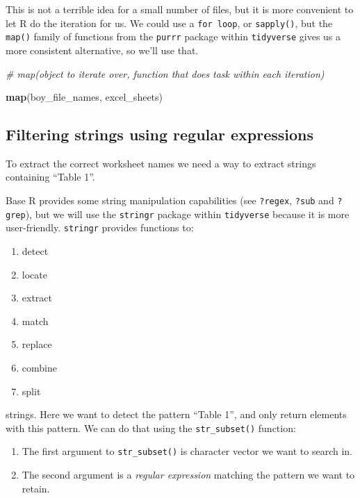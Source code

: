 \documentclass[]{book}
\newenvironment{Shaded}{\begin{snugshade}}{\end{snugshade}}
\newcommand{\CommentTok}[1]{\textcolor[rgb]{0.56,0.35,0.01}{\textit{#1}}}
\newcommand{\KeywordTok}[1]{\textcolor[rgb]{0.13,0.29,0.53}{\textbf{#1}}}
\newcommand{\NormalTok}[1]{#1}
\providecommand{\tightlist}{%
  \setlength{\itemsep}{0pt}\setlength{\parskip}{0pt}}
\begin{document}
This is not a terrible idea for a small number of files, but it is
more convenient to let R do the iteration for us. We could use a \texttt{for\ loop},
or \texttt{sapply()}, but the \texttt{map()} family of functions from the \texttt{purrr}
package within \texttt{tidyverse} gives us a more consistent alternative,
so we'll use that.

\begin{Shaded}
\begin{Highlighting}[]
\CommentTok{# map(object to iterate over, function that does task within each iteration)}

\KeywordTok{map}\NormalTok{(boy_file_names, excel_sheets)}
\end{Highlighting}
\end{Shaded}

\hypertarget{filtering-strings-using-regular-expressions}{%
\subsection{Filtering strings using regular expressions}\label{filtering-strings-using-regular-expressions}}

To extract the correct worksheet names we need a way to extract
strings containing ``Table 1''.

Base R provides some string manipulation capabilities
(see \texttt{?regex}, \texttt{?sub} and \texttt{?grep}), but we will use the
\texttt{stringr} package within \texttt{tidyverse} because it is more
user-friendly. \texttt{stringr} provides functions to:

\begin{enumerate}
\def\labelenumi{\arabic{enumi}.}
\tightlist
\item
  detect
\item
  locate
\item
  extract
\item
  match
\item
  replace
\item
  combine
\item
  split
\end{enumerate}

strings. Here we want to detect the pattern ``Table 1'', and only
return elements with this pattern. We can do that using the
\texttt{str\_subset()} function:

\begin{enumerate}
\def\labelenumi{\arabic{enumi}.}
\tightlist
\item
  The first argument to \texttt{str\_subset()} is character vector we want to search in.
\item
  The second argument is a \emph{regular expression} matching the pattern we want to retain.
\end{enumerate}
\end{document}
